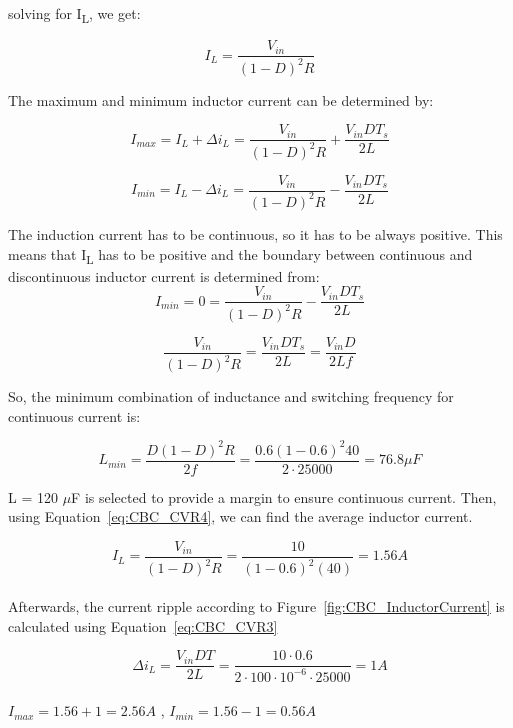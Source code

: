 solving for I\textsubscript{L}, we get:

\begin{equation}
	I_L = \frac{V_{in}}{(1-D)^2R}
	\label{eq:CBC_CVR4}
\end{equation}

The maximum and minimum inductor current can be determined by:

\begin{equation}
	I_{max} = I_L + \Delta i_L = \frac{V_{in}}{(1-D)^2R} + \frac{V_{in}DT_s}{2L}
	\label{eq:CBC_CVR4}
\end{equation}

\begin{equation}
	I_{min} = I_L - \Delta i_L = \frac{V_{in}}{(1-D)^2R} - \frac{V_{in}DT_s}{2L}
	\label{eq:CBC_CVR4}
\end{equation}


The induction current has to be continuous, so it has to be always positive. This means that I\textsubscript{L} has to be positive and the boundary between continuous and discontinuous inductor current is determined from:\\
\begin{equation}
	I_{min} = 0 = \frac{V_{in}}{(1-D)^2R} - \frac{V_{in}DT_s}{2L}
\end{equation}

\begin{equation}
	\frac{V_{in}}{(1-D)^2R} = \frac{V_{in}DT_s}{2L} = \frac{V_{in}D}{2Lf}
\end{equation}


So, the minimum combination of inductance and switching frequency for continuous current is:

\begin{equation}
L_{min} = \frac{D(1-D)^2R}{2f} = \frac{0.6(1-0.6)^2 40}{2\cdot25000} = 76.8\mu F
\end{equation}


L = 120 $\mu$F is selected to provide a margin to ensure continuous current.
Then, using Equation~\ref{eq:CBC_CVR4}, we can find the average inductor current.

\begin{equation}
I_L = \frac{V_{in}}{(1-D)^2R} = \frac{10}{(1-0.6)^2(40)} = 1.56 A
\end{equation}\\
Afterwards, the current ripple according to Figure~\ref{fig:CBC_InductorCurrent} is calculated using Equation~\ref{eq:CBC_CVR3}

\begin{equation}
\Delta i_L = \frac{V_{in}DT}{2L} = \frac{10\cdot 0.6}{2\cdot 100\cdot 10^{-6}\cdot 25000} = 1 A
\end{equation}\\
$I_{max} = 1.56 + 1 = 2.56 A$ , 
$I_{min} = 1.56 - 1 = 0.56 A$


